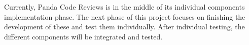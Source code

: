 
Currently, Panda Code Reviews is in the middle of its individual components implementation phase. The next phase of this project focuses on finishing the development of these and test them individually. After individual testing, the different components will be integrated and tested.